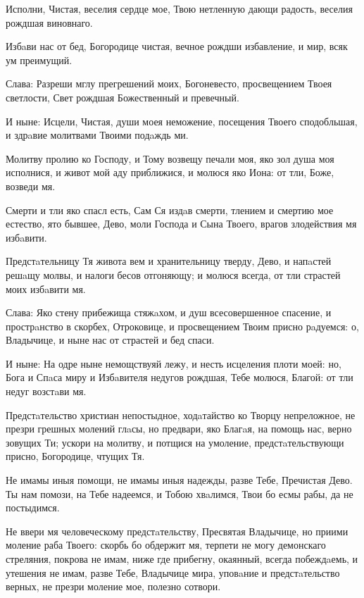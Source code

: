 Исполни, Чистая, веселия сердце мое, Твою нетленную дающи радость, веселия рождшая виновнаго.

Избaви нас от бед, Богородице чистая, вечное рождши избавление, и мир, всяк ум преимущий.

Слава: Разреши мглу прегрешений моих, Богоневесто, просвещением Твоея светлости, Свет рождшая Божественный и превечный.

И ныне: Исцели, Чистая, души моея неможение, посещения Твоего сподобльшая, и здрaвие молитвами Твоими подaждь ми.




Молитву пролию ко Господу, и Тому возвещу печали моя, яко зол душа моя исполнися, и живот мой аду приближися, и молюся яко Иона: от тли, Боже, возведи мя.


Смерти и тли яко спасл есть, Сам Ся издaв смерти, тлением и смертию мое естество, ято бывшее, Дево, моли Господа и Сына Твоего, врагов злодействия мя избaвити.


Предстaтельницу Тя живота вем и хранительницу тверду, Дево, и напaстей решaщу молвы, и налоги бесов отгоняющу; и молюся всегда, от тли страстей моих избaвити мя.


Слава: Яко стену прибежища стяжaхом, и душ всесовершенное спасение, и прострaнство в скорбех, Отроковице, и просвещением Твоим присно рaдуемся: о, Владычице, и ныне нас от страстей и бед спаси.


И ныне: На одре ныне немощствуяй лежу, и несть исцеления плоти моей: но, Бога и Спaса миру и Избaвителя недугов рождшая, Тебе молюся, Благой: от тли недуг возстaви мя.




Предстaтельство христиан непостыдное, ходaтайство ко Творцу непреложное, не презри грешных молений глaсы, но предвари, яко Благaя, на помощь нас, верно зовущих Ти; ускори на молитву, и потщися на умоление, предстaтельствующи присно, Богородице, чтущих Тя.







 Не имамы иныя помощи, не имамы иныя надежды, разве Тебе, Пречистая Дево. Ты нам помози, на Тебе надеемся, и Тобою хвaлимся, Твои бо есмы рабы, да не постыдимся.



Не ввери мя человеческому предстaтельству, Пресвятая Владычице, но приими моление раба Твоего: скорбь бо обдержит мя, терпети не могу демонскаго стреляния, покрова не имам, ниже где прибегну, окаянный, всегда побеждaемь, и утешения не имам, разве Тебе, Владычице мира, уповaние и предстaтельство верных, не презри моление мое, полезно сотвори.


